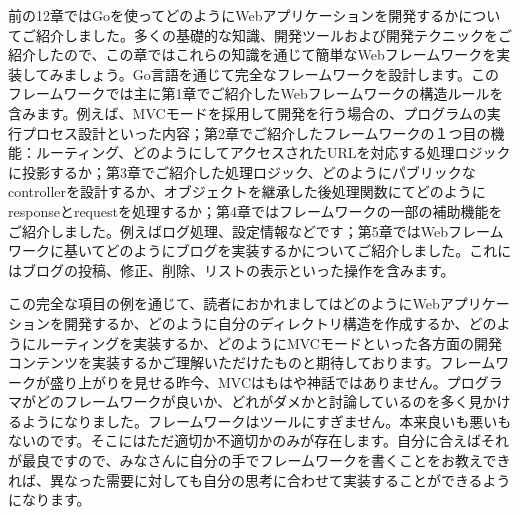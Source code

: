 前の12章ではGoを使ってどのようにWebアプリケーションを開発するかについてご紹介しました。多くの基礎的な知識、開発ツールおよび開発テクニックをご紹介したので、この章ではこれらの知識を通じて簡単なWebフレームワークを実装してみましょう。Go言語を通じて完全なフレームワークを設計します。このフレームワークでは主に第1章でご紹介したWebフレームワークの構造ルールを含みます。例えば、MVCモードを採用して開発を行う場合の、プログラムの実行プロセス設計といった内容；第2章でご紹介したフレームワークの１つ目の機能：ルーティング、どのようにしてアクセスされたURLを対応する処理ロジックに投影するか；第3章でご紹介した処理ロジック、どのようにパブリックなcontrollerを設計するか、オブジェクトを継承した後処理関数にてどのようにresponseとrequestを処理するか；第4章ではフレームワークの一部の補助機能をご紹介しました。例えばログ処理、設定情報などです；第5章ではWebフレームワークに基いてどのようにブログを実装するかについてご紹介しました。これにはブログの投稿、修正、削除、リストの表示といった操作を含みます。

この完全な項目の例を通じて、読者におかれましてはどのようにWebアプリケーションを開発するか、どのように自分のディレクトリ構造を作成するか、どのようにルーティングを実装するか、どのようにMVCモードといった各方面の開発コンテンツを実装するかご理解いただけたものと期待しております。フレームワークが盛り上がりを見せる昨今、MVCはもはや神話ではありません。プログラマがどのフレームワークが良いか、どれがダメかと討論しているのを多く見かけるようになりました。フレームワークはツールにすぎません。本来良いも悪いもないのです。そこにはただ適切か不適切かのみが存在します。自分に合えばそれが最良ですので、みなさんに自分の手でフレームワークを書くことをお教えできれば、異なった需要に対しても自分の思考に合わせて実装することができるようになります。
